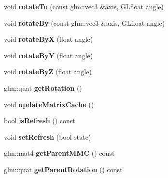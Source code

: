 \begin{DoxyCompactItemize}
\item 
void {\bfseries rotate\+To} (const glm\+::vec3 \&axis, G\+Lfloat angle)\hypertarget{classflw_1_1flf_1_1Moveable_af0bb11c2db725cf96d346bf890f99a88}{}\label{classflw_1_1flf_1_1Moveable_af0bb11c2db725cf96d346bf890f99a88}

\item 
void {\bfseries rotate\+By} (const glm\+::vec3 \&axis, G\+Lfloat angle)\hypertarget{classflw_1_1flf_1_1Moveable_a26bea12bc986d6fbd74b9de2fc5853c8}{}\label{classflw_1_1flf_1_1Moveable_a26bea12bc986d6fbd74b9de2fc5853c8}

\item 
void {\bfseries rotate\+ByX} (float angle)\hypertarget{classflw_1_1flf_1_1Moveable_adce25dc58b98fe169130c1048b819c70}{}\label{classflw_1_1flf_1_1Moveable_adce25dc58b98fe169130c1048b819c70}

\item 
void {\bfseries rotate\+ByY} (float angle)\hypertarget{classflw_1_1flf_1_1Moveable_aa7d551d487f77303ce41ee008ecbc062}{}\label{classflw_1_1flf_1_1Moveable_aa7d551d487f77303ce41ee008ecbc062}

\item 
void {\bfseries rotate\+ByZ} (float angle)\hypertarget{classflw_1_1flf_1_1Moveable_afc12f5dfdbca88ab5829d59a2c9afe24}{}\label{classflw_1_1flf_1_1Moveable_afc12f5dfdbca88ab5829d59a2c9afe24}

\item 
glm\+::quat {\bfseries get\+Rotation} ()\hypertarget{classflw_1_1flf_1_1Moveable_a90053792a763a549fe95ac5afa42f735}{}\label{classflw_1_1flf_1_1Moveable_a90053792a763a549fe95ac5afa42f735}

\item 
void {\bfseries update\+Matrix\+Cache} ()\hypertarget{classflw_1_1flf_1_1Moveable_a4bd6c8d74b1663b53b715c5e54c45262}{}\label{classflw_1_1flf_1_1Moveable_a4bd6c8d74b1663b53b715c5e54c45262}

\item 
bool {\bfseries is\+Refresh} () const \hypertarget{classflw_1_1flf_1_1Moveable_aca15f0e6e1e23cfa7b944a806649b5af}{}\label{classflw_1_1flf_1_1Moveable_aca15f0e6e1e23cfa7b944a806649b5af}

\item 
void {\bfseries set\+Refresh} (bool state)\hypertarget{classflw_1_1flf_1_1Moveable_a2d421e557a07e8de451af7bc4eafc0bd}{}\label{classflw_1_1flf_1_1Moveable_a2d421e557a07e8de451af7bc4eafc0bd}

\item 
glm\+::mat4 {\bfseries get\+Parent\+M\+MC} () const \hypertarget{classflw_1_1flf_1_1Moveable_ab159328179f734fd02d0676a2567ed99}{}\label{classflw_1_1flf_1_1Moveable_ab159328179f734fd02d0676a2567ed99}

\item 
glm\+::quat {\bfseries get\+Parent\+Rotation} () const \hypertarget{classflw_1_1flf_1_1Moveable_aed2aa4e50974b4b6d2c6adeed969f28a}{}\label{classflw_1_1flf_1_1Moveable_aed2aa4e50974b4b6d2c6adeed969f28a}

\end{DoxyCompactItemize}

